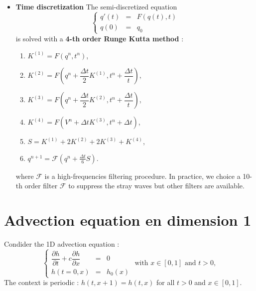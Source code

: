 \documentclass{sciposter}
\begin{document}
\begin{multicols}{3}
\begin{itemize}
\item \textbf{Time discretization} The semi-discretized equation
\begin{equation}
\left\lbrace
\begin{array}{rcl}
q'(t) &=& F(q(t),t)\\
q(0)  &=& q_0 
\end{array}
\right.
\end{equation}
is solved with a \textbf{4-th order Runge Kutta method} :
\begin{center}
\begin{enumerate}
\item $K^{(1)} = F \left( q^n, t^n \right)$,
\item $K^{(2)} = F \left( q^n + \dfrac{\Delta t}{2} K^{(1)}, t^n + \dfrac{\Delta t}{t}\right)$,
\item $K^{(3)} = F \left( q^n + \dfrac{\Delta t}{2} K^{(2)}, t^n + \dfrac{\Delta t}{t}\right)$,
\item $K^{(4)} = F \left( V^n + \Delta t K^{(3)}, t^n + \Delta t\right)$,  
\item $S = K^{(1)} + 2 K^{(2)} + 2 K^{(3)} + K^{(4)}$,
\item $q^{n+1} = \mathcal{F} \left( q^n  + \frac{\Delta t}{6} S \right)$.
\end{enumerate}
\end{center}

where $\mathcal{F}$ is a high-frequencies filtering procedure.
In practice, we choice a 10-th order filter $\mathcal{F}$ to suppress the stray waves but other filters are available. 
\end{itemize}




\section{Advection equation en dimension 1}
Condider the 1D advection equation :
\begin{equation}
\left\lbrace
\begin{array}{rcl}
\dfrac{\partial h}{\partial t} + c \dfrac{\partial h}{\partial x} & = & 0 \\
h(t=0,x) & = & h_0(x)
\end{array}
\right. \text{ with } x \in [0,1] \text{ and } t>0,
\label{eq:advection1D}
\end{equation}
The context is periodic : $h(t,x+1) = h(t,x)$ for all $t>0$ and $x \in [0,1]$.


\end{multicols}
\end{document}
